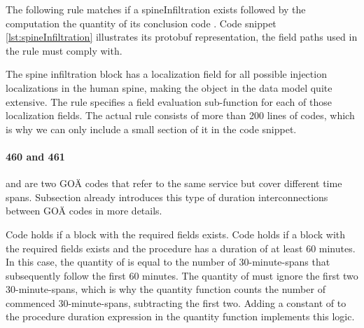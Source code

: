 The following rule matches if a spineInfiltration exists followed by the computation the quantity of its conclusion code .
Code snippet \ref{lst:spineInfiltration} illustrates its protobuf representation, the field paths used in the rule must comply with.



The spine infiltration block has a localization field for all possible injection localizations in the human spine,
making the object in the data model quite extensive.
The rule specifies a field evaluation sub-function for each of those localization fields.
The actual rule consists of more than 200 lines of codes,
which is why we can only include a small section of it in the code snippet.


\paragraph{460 and 461}
and  are two GOÄ codes that refer to the same service but cover different time spans.
Subsection  already introduces this type of duration interconnections between GOÄ codes in more details.



Code  holds if a  block with the required fields exists.
Code  holds if a  block with the required fields exists and the procedure has a duration of at least 60 minutes.
In this case, the quantity of  is equal to the number of 30-minute-spans that subsequently follow the first 60 minutes.
The quantity of  must ignore the first two 30-minute-spans, which is why the quantity function counts the number of commenced 30-minute-spans, subtracting the first two.
Adding a constant of  to the procedure duration expression in the quantity function implements this logic.

